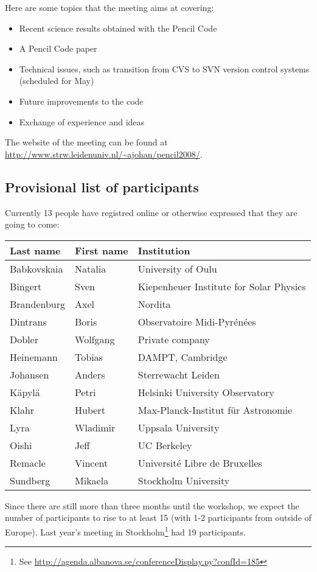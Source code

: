 \documentclass{article}
\begin{document}
Here are some topics that the meeting aims at covering:
\begin{itemize}
  \item Recent science results obtained with the Pencil Code
  \item A Pencil Code paper
  \item Technical issues, such as transition from CVS to SVN version
    control systems (scheduled for May)
  \item Future improvements to the code
  \item Exchange of experience and ideas
\end{itemize}
The website of the meeting can be found at\\
\url{http://www.strw.leidenuniv.nl/~ajohan/pencil2008/}.

\subsection*{Provisional list of participants}

Currently 13 people have registred online or otherwise expressed that they are
going to come:
\begin{center}
  \begin{tabular}{lll}
    Last name & First name & Institution \\
    \hline
    Babkovskaia &  Natalia &  University of Oulu\\
    Bingert &  Sven &  Kiepenheuer Institute for Solar Physics\\
    Brandenburg &  Axel &  Nordita\\
    Dintrans &  Boris &  Observatoire Midi-Pyr\'en\'ees\\
    Dobler &  Wolfgang & Private company \\
    Heinemann & Tobias & DAMPT, Cambridge \\
    Johansen &  Anders &  Sterrewacht Leiden\\
    K\"apyl\"a &  Petri &  Helsinki University Observatory\\
    Klahr &  Hubert &  Max-Planck-Institut f\"ur Astronomie\\
    Lyra &  Wladimir &  Uppsala University\\
    Oishi & Jeff & UC Berkeley \\
    Remacle &  Vincent &  Universit\'e Libre de Bruxelles\\
    Sundberg &  Mikaela &  Stockholm University\\
  \end{tabular}
\end{center}
Since there are still more than three months until the workshop, we expect the
number of participants to rise to at least 15 (with 1-2 participants from
outside of Europe). Last year's meeting in
Stockholm\footnote{See
\url{http://agenda.albanova.se/conferenceDisplay.py?confId=185}} had 19
participants.
\end{document}

